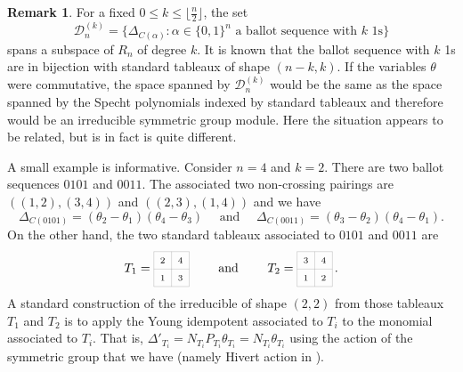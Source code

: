 \documentclass[11pt]{amsart}
\theoremstyle{definition}
\newtheorem{remark}[theorem]{Remark}
\numberwithin{equation}{section}
\begin{document}
\begin{remark} For a fixed $0\le k\le \lfloor \frac{n}{2}\rfloor$, the set
$${\mathcal D}^{(k)}_n =\big\{ \Delta_{C(\alpha)}:  \alpha \in \{0, 1\}^n \text{ a ballot sequence with $k$  1s}\big\}$$
spans a subspace of $R_n$ of degree $k$.
It is known that the ballot sequence with $k$ 1s are in bijection with standard tableaux of shape $(n-k,k)$.
If  the variables $\theta$  were  commutative, the space spanned by ${\mathcal D}^{(k)}_n$ would be the same as the space spanned
by the Specht polynomials indexed by standard tableaux and therefore
would be an irreducible symmetric group module.
Here the situation appears to be related, but is in fact is quite different.

A small example is informative.
Consider $n=4$ and $k=2$.
There are two ballot sequences $0101$ and $0011$.
The associated two non-crossing pairings are
$((1,2),(3,4))$ and $((2,3),(1,4))$ and we have 
$$\Delta_{C(0101)}=  (\theta_{2}-\theta_{1})(\theta_{4}-\theta_{3}) \quad\text{ and }\quad \Delta_{C(0011)}=(\theta_{3}-\theta_{2})(\theta_{4}-\theta_{1}).
$$  
On the other hand, the two standard tableaux associated to $0101$ and $0011$ are
$$ 
T_1=\begin{tikzpicture}[scale=0.5,baseline=12pt] 
	\draw[help lines] (0,0) grid (2,2);
	\node at (.5,.5){$\scriptstyle 1$};
	\node at (.5,1.5){$\scriptstyle 2$};
	\node at (1.5,.5){$\scriptstyle 3$};
	\node at (1.5,1.5){$\scriptstyle 4$};
\end{tikzpicture}
\qquad\text{ and }\qquad
T_2=\begin{tikzpicture}[scale=0.5,baseline=12pt] 
	\draw[help lines] (0,0) grid (2,2);
	\node at (.5,.5){$\scriptstyle 1$};
	\node at (.5,1.5){$\scriptstyle 3$};
	\node at (1.5,.5){$\scriptstyle 2$};
	\node at (1.5,1.5){$\scriptstyle 4$};
\end{tikzpicture}\,.
$$
A standard construction of the irreducible of shape  $(2,2)$ from those tableaux $T_1$ and $T_2$
is to apply the Young idempotent associated to $T_i$ to the monomial associated to $T_i$.
That is, $\Delta'_{T_i}=N_{T_i}P_{T_i} \theta_{T_i}=N_{T_i}\theta_{T_i}$
using the action of the symmetric group that we have (namely Hivert action in \cite{Hi} ).



\end{remark}
\end{document}
